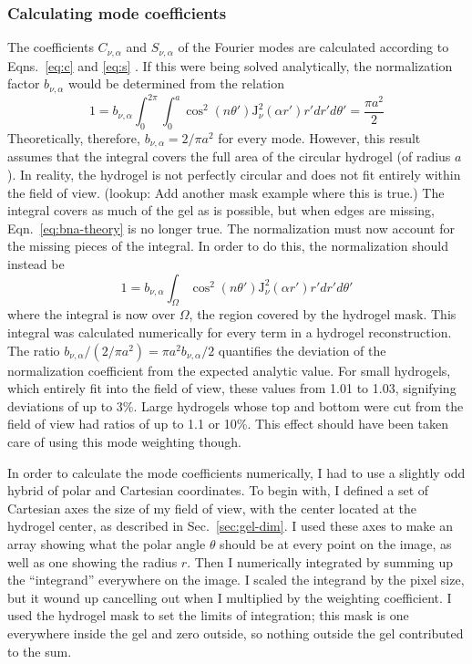\subsubsection{Calculating mode coefficients}
\label{sec:calcCoeffs}

The coefficients $C_{\nu,\alpha}$ and $S_{\nu,\alpha}$ of the Fourier modes are calculated according to Eqns.~\ref{eq:c} and \ref{eq:s} .  If this were being solved analytically, the normalization factor $b_{\nu,\alpha}$ would be determined from the relation
\begin{equation}
1 = b_{\nu,\alpha} \int_0^{2\pi} \int_0^a \cos^2\left(n\theta'\right) \mathrm{J}^2_\nu(\alpha r') r' dr' d\theta' = \frac{\pi a^2}{2}
\label{eq:bna-theory}
\end{equation}
Theoretically, therefore, $b_{\nu,\alpha} = 2/\pi a^2$ for every mode.  However, this result assumes that the integral covers the full area of the circular hydrogel (of radius $a$).  In reality, the hydrogel is not perfectly circular and does not fit entirely within the field of view.  (lookup: Add another mask example where this is true.)  The integral covers as much of the gel as is possible, but when edges are missing, Eqn.~\ref{eq:bna-theory} is no longer true.  The normalization must now account for the missing pieces of the integral.  In order to do this, the normalization should instead be
\begin{equation}
1 = b_{\nu,\alpha} \int_\Omega \cos^2\left(n\theta'\right) \mathrm{J}^2_\nu(\alpha r')r' dr' d\theta' 
\label{eq:bna-real}
\end{equation} where the integral is now over $\Omega$, the region covered by the hydrogel mask.  This integral was calculated numerically for every term in a hydrogel reconstruction.  The ratio $b_{\nu,\alpha} /(2/\pi a^2) = \pi a^2 b_{\nu,\alpha} /2$ quantifies the deviation of the normalization coefficient from the expected analytic value.  For small hydrogels, which entirely fit into the field of view, these values from 1.01 to 1.03, signifying deviations of up to 3\%.  Large hydrogels whose top and bottom were cut from the field of view had ratios of up to 1.1 or 10\%.  This effect should have been taken care of using this mode weighting though.

In order to calculate the mode coefficients numerically, I had to use a slightly odd hybrid of polar and Cartesian coordinates.  To begin with, I defined a set of Cartesian axes the size of my field of view, with the center located at the hydrogel center, as described in Sec.~\ref{sec:gel-dim}.  I used these axes to make an array showing what the polar angle $\theta$ should be at every point on the image, as well as one showing the radius $r$.  Then I numerically integrated by summing up the ``integrand'' everywhere on the image.  I scaled the integrand by the pixel size, but it wound up cancelling out when I multiplied by the weighting coefficient.  I used the hydrogel mask to set the limits of integration; this mask is one everywhere inside the gel and zero outside, so nothing outside the gel contributed to the sum.  

